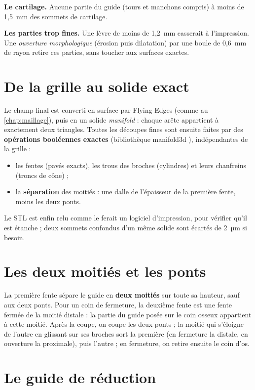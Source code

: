 \textbf{Le cartilage.} Aucune partie du guide (tours et manchons compris) à moins de 1,5~mm des sommets de cartilage.

\textbf{Les parties trop fines.} Une lèvre de moins de 1,2~mm casserait à l'impression. Une \emph{ouverture
morphologique} (érosion puis dilatation) par une boule de 0,6~mm de rayon retire ces parties, sans toucher aux surfaces
exactes.

\section{De la grille au solide exact}

Le champ final est converti en surface par Flying Edges (comme au \cref{chap:maillage}), puis en un solide
\emph{manifold} : chaque arête appartient à exactement deux triangles. Toutes les découpes fines sont ensuite faites
par des \textbf{opérations booléennes exactes} (bibliothèque manifold3d \cite{manifold}), indépendantes de la grille :
\begin{itemize}
  \item les fentes (pavés exacts), les trous des broches (cylindres) et leurs chanfreins (troncs de cône) ;
  \item la \textbf{séparation} des moitiés : une dalle de l'épaisseur de la première fente, moins les deux ponts.
\end{itemize}
Le STL est enfin relu comme le ferait un logiciel d'impression, pour vérifier qu'il est étanche ; deux sommets
confondus d'un même solide sont écartés de 2~µm si besoin.

\section{Les deux moitiés et les ponts}

La première fente sépare le guide en \textbf{deux moitiés} sur toute sa hauteur, sauf aux deux ponts. Pour un coin de
fermeture, la deuxième fente est une fente fermée de la moitié distale : la partie du guide posée sur le coin osseux
appartient à cette moitié. Après la coupe, on coupe les deux ponts ; la moitié qui s'éloigne de l'autre en glissant sur
ses broches sort la première (en fermeture la distale, en ouverture la proximale), puis l'autre ; en fermeture, on
retire ensuite le coin d'os.

\section{Le guide de réduction}
\label{sec:reduction}


